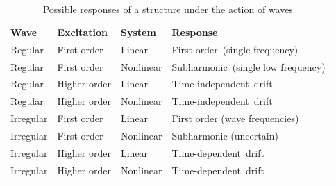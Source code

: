 \begin{table}
\centering
\begin{tabular}{|l|l|l|l|} 
\hline
\textbf{Wave}      & \textbf{Excitation}   & \textbf{System}    & \textbf{Response}                            \\ 
\hhline{|====|}
Regular   & First order  & Linear    & First order~(single frequency)      \\ 
\hline
Regular   & First order  & Nonlinear & Subharmonic~(single low frequency)  \\ 
\hline
Regular   & Higher order & Linear    & Time-independent~drift              \\ 
\hline
Regular   & Higher order & Nonlinear & Time-independent~drift              \\ 
\hline
Irregular & First order  & Linear    & First order (wave frequencies)      \\ 
\hline
Irregular & First order  & Nonlinear & Subharmonic (uncertain)             \\ 
\hline
Irregular & Higher order & Linear    & Time-dependent~drift                \\ 
\hline
Irregular & Higher order & Nonlinear & Time-dependent~drift                \\
\hline
\end{tabular}
\caption{Possible responses of a structure under the action of waves \citep{journee2000offshore}}
\end{table} 










